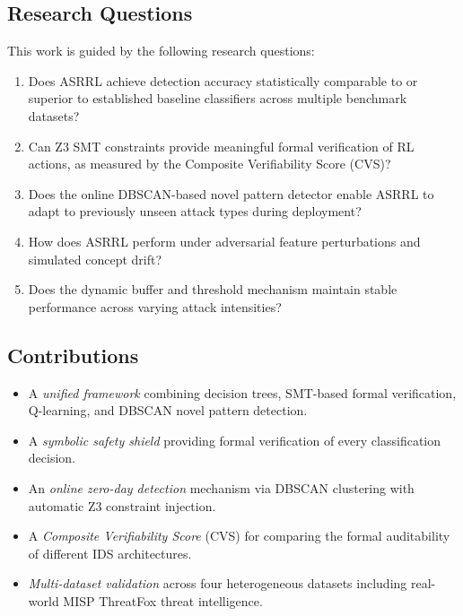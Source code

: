 \documentclass[conference]{IEEEtran}
\newcommand{\ASRRL}{\textsc{ASRRL}}
\begin{document}
\subsection{Research Questions}

This work is guided by the following research questions:

\begin{enumerate}[label=\textbf{RQ\arabic*.}]
    \item Does \ASRRL{} achieve detection accuracy statistically comparable to or superior to established baseline classifiers across multiple benchmark datasets?
    \item Can Z3 SMT constraints provide meaningful formal verification of RL actions, as measured by the Composite Verifiability Score (CVS)?
    \item Does the online DBSCAN-based novel pattern detector enable \ASRRL{} to adapt to previously unseen attack types during deployment?
    \item How does \ASRRL{} perform under adversarial feature perturbations and simulated concept drift?
    \item Does the dynamic buffer and threshold mechanism maintain stable performance across varying attack intensities?
\end{enumerate}

\subsection{Contributions}

\begin{itemize}
    \item A \emph{unified framework} combining decision trees, SMT-based formal verification, Q-learning, and DBSCAN novel pattern detection.
    \item A \emph{symbolic safety shield} providing formal verification of every classification decision.
    \item An \emph{online zero-day detection} mechanism via DBSCAN clustering with automatic Z3 constraint injection.
    \item A \emph{Composite Verifiability Score} (CVS) for comparing the formal auditability of different IDS architectures.
    \item \emph{Multi-dataset validation} across four heterogeneous datasets including real-world MISP ThreatFox threat intelligence.
\end{itemize}


\end{document}
